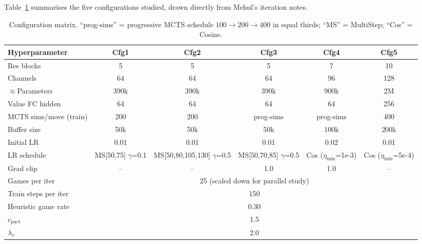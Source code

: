 \documentclass[11pt,a4paper]{article}
\begin{document}
Table~\ref{tab:configs} summarises the five configurations studied, drawn
directly from Mehul's iteration notes.

\begin{table}[h]
\centering
\caption{Configuration matrix.  ``prog-sims'' = progressive MCTS schedule
$100 \to 200 \to 400$ in equal thirds; ``MS'' = MultiStep; ``Cos'' = Cosine.}
\label{tab:configs}
\setlength{\tabcolsep}{5pt}
\begin{tabular}{l|ccccc}
\toprule
\textbf{Hyperparameter} & \textbf{Cfg1} & \textbf{Cfg2} & \textbf{Cfg3}
                        & \textbf{Cfg4} & \textbf{Cfg5} \\
\midrule
Res blocks             & 5    & 5    & 5         & 7         & 10   \\
Channels               & 64   & 64   & 64        & 96        & 128  \\
$\approx$Parameters    & 390k & 390k & 390k      & 900k      & 2M   \\
Value FC hidden        & 64   & 64   & 64        & 64        & 256  \\
MCTS sims/move (train) & 200  & 200  & prog-sims & prog-sims & 400  \\
Buffer size            & 50k  & 50k  & 50k       & 100k      & 200k \\
Initial LR             & 0.01 & 0.01 & 0.01      & 0.02      & 0.01 \\
LR schedule            & MS[50,75] $\gamma$=0.1
                              & MS[50,80,105,130] $\gamma$=0.5
                                     & MS[50,70,85] $\gamma$=0.5
                                                & Cos ($\eta_\text{min}$=1e-3)
                                                           & Cos ($\eta_\text{min}$=5e-4) \\
Grad clip              & --   & --   & 1.0       & 1.0       & --   \\
\midrule
Games per iter         & \multicolumn{5}{c}{25 (scaled down for parallel study)} \\
Train steps per iter   & \multicolumn{5}{c}{150} \\
Heuristic game rate    & \multicolumn{5}{c}{0.30} \\
$c_\text{puct}$        & \multicolumn{5}{c}{1.5}  \\
$\lambda_v$            & \multicolumn{5}{c}{2.0}  \\
\bottomrule
\end{tabular}
\end{table}
\end{document}
